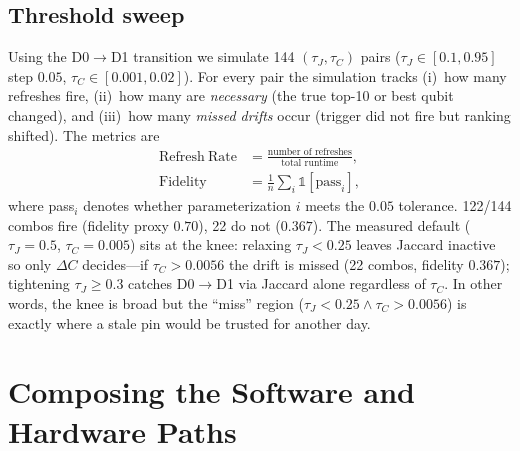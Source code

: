 \documentclass[journal,10pt,twocolumn]{IEEEtran}
\begin{document}
\subsection{Threshold sweep}
\label{sec:sweep}
Using the D0$\to$D1 transition we simulate 144 $(\tau_J,\tau_C)$ pairs ($\tau_J{\in}[0.1,0.95]$ step $0.05$,
$\tau_C{\in}[0.001,0.02]$). For every pair the simulation tracks (i)~how many refreshes fire, (ii)~how many are
\emph{necessary} (the true top-10 or best qubit changed), and (iii)~how many \emph{missed drifts} occur
(trigger did not fire but ranking shifted). The metrics are
\begin{equation}\begin{aligned}
\mathrm{Refresh\ Rate} &= \frac{\text{number of refreshes}}{\text{total runtime}},\\
\mathrm{Fidelity} &= \frac{1}{n}\sum_i \mathbb{1}[\text{pass}_i],
\end{aligned}\label{eq:sweep}
\end{equation}
where pass$_i$ denotes whether parameterization $i$ meets the $0.05$ tolerance. 122/144 combos fire (fidelity proxy
$0.70$), 22 do not ($0.367$). The measured default ($\tau_J{=}0.5$, $\tau_C{=}0.005$) sits at the knee:
relaxing $\tau_J{<}0.25$ leaves Jaccard inactive so only $\Delta C$ decides---if $\tau_C{>}0.0056$ the drift is
missed (22 combos, fidelity $0.367$); tightening $\tau_J{\ge}0.3$ catches D0$\to$D1 via Jaccard alone regardless
of $\tau_C$. In other words, the knee is broad but the ``miss'' region ($\tau_J{<}0.25 \land \tau_C{>}0.0056$)
is exactly where a stale pin would be trusted for another day.

\section{Composing the Software and Hardware Paths}
\label{sec:e2e}
\end{document}
